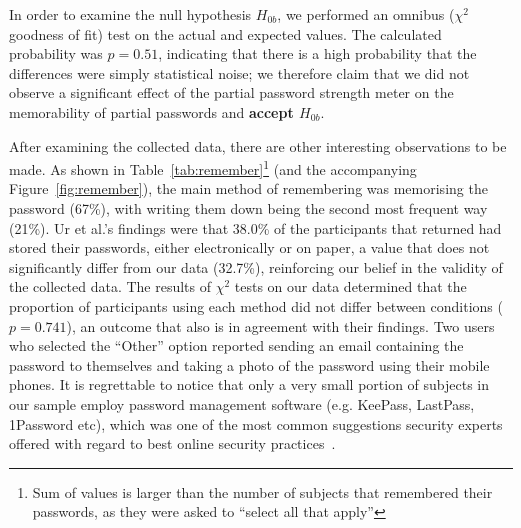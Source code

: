     In order to examine the null hypothesis $H_{0b}$, we performed an omnibus ($\chi^2$ goodness of fit) test on the actual and expected values. The calculated probability was $p=0.51$, indicating that there is a high probability that the differences were simply statistical noise; we therefore claim that we did not observe a significant effect of the partial password strength meter on the memorability of partial passwords and \textbf{accept $H_{0b}$}.

    After examining the collected data, there are other interesting observations to be made. As shown in Table~\ref{tab:remember}\footnote{Sum of values is larger than the number of subjects that remembered their passwords, as they were asked to ``select all that apply''} (and the accompanying Figure~\ref{fig:remember}), the main method of remembering was memorising the password (67\%), with writing them down being the second most frequent way (21\%). Ur et al.'s findings were that 38.0\% of the participants that returned had stored their passwords, either electronically or on paper, a value that does not significantly differ from our data (32.7\%), reinforcing our belief in the validity of the collected data. The results of $\chi^2$ tests on our data determined that the proportion of participants using each method did not differ between conditions ($p=0.741$), an outcome that also is in agreement with their findings. Two users who selected the ``Other'' option reported sending an email containing the password to themselves and taking a photo of the password using their mobile phones. It is regrettable to notice that only a very small portion of subjects in our sample employ password management software (e.g. KeePass, LastPass, 1Password etc), which was one of the most common suggestions security experts offered with regard to best online security practices~\cite{security_practices_experts}.

